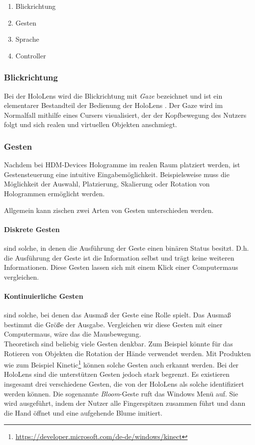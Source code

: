 \begin{enumerate}
  \item Blickrichtung
  \item Gesten
  \item Sprache
  \item Controller
\end{enumerate}

\subsubsection*{Blickrichtung}
Bei der HoloLens wird die Blickrichtung mit \textit{Gaze} bezeichnet und ist ein elementarer Bestandteil der Bedienung der HoloLens \cite{windows2017interaction}. Der Gaze wird im Normalfall mithilfe eines Cursers visualisiert, der der Kopfbewegung des Nutzers folgt und sich realen und virtuellen Objekten anschmiegt.

\subsubsection*{Gesten}
Nachdem bei HDM-Devices Hologramme im realen Raum platziert werden, ist Gestensteuerung eine intuitive Eingabemöglichkeit. Beispielsweise muss die Möglichkeit der Auswahl, Platzierung, Skalierung oder Rotation von Hologrammen ermöglicht werden.

Allgemein kann zischen zwei Arten von Gesten unterschieden werden.

\paragraph{Diskrete Gesten} sind solche, in denen die Ausführung der Geste einen binären Status besitzt. D.h. die Ausführung der Geste ist die Information selbst und trägt keine weiteren Informationen. Diese Gesten lassen sich mit einem Klick einer Computermaus vergleichen.

\paragraph{Kontinuierliche Gesten} sind solche, bei denen das Ausmaß der Geste eine Rolle spielt. Das Ausmaß bestimmt die Größe der Ausgabe. Vergleichen wir diese Gesten mit einer Computermaus, wäre das die Mausbewegung.\\

Theoretisch sind beliebig viele Gesten denkbar. Zum Beispiel könnte für das Rotieren von Objekten die Rotation der Hände verwendet werden. Mit Produkten wie zum Beispiel Kinetic\footnote{\url{https://developer.microsoft.com/de-de/windows/kinect}} können solche Gesten auch erkannt werden. Bei der HoloLens sind die unterstützen Gesten jedoch stark begrenzt. Es existieren insgesamt drei verschiedene Gesten, die von der HoloLens als solche identifiziert werden können. Die sogenannte \textit{Bloom}-Geste ruft das Windows Menü auf. Sie wird ausgeführt, indem der Nutzer alle Fingerspitzen zusammen führt und dann die Hand öffnet und eine aufgehende Blume imitiert.

